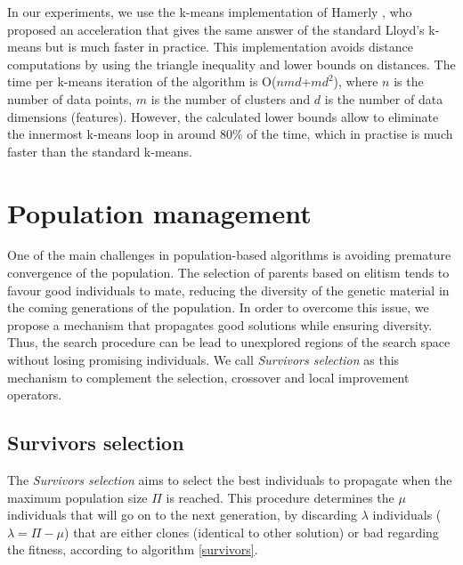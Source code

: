 In our experiments, we use the k-means implementation of Hamerly \cite{Hamerly2010}, who proposed an acceleration that gives the same answer of the standard Lloyd's k-means \cite{Lloyd1982} but is much faster in practice. This implementation avoids distance computations by using the triangle inequality and lower bounds on distances. The time per k-means iteration of the algorithm is O($nmd$+$md^2$), where $n$ is the number of data points, $m$ is the number of clusters and $d$ is the number of data dimensions (features). However, the calculated lower bounds allow to eliminate the innermost k-means loop in around 80\% of the time, which in practise is much faster than the standard k-means.

\section{Population management}
\label{sec:population-management}
One of the main challenges in population-based algorithms is avoiding premature convergence of the population. The selection of parents based on elitism tends to favour good individuals to mate, reducing the diversity of the genetic material in the coming generations of the population. In order to overcome this issue, we propose a mechanism that propagates good solutions while ensuring diversity. Thus, the search procedure can be lead to unexplored regions of the search space without losing promising individuals. We call \textit{Survivors selection} as this mechanism to complement the selection, crossover and local improvement operators.


\subsection{Survivors selection}
\label{subsec:survivors}
The \textit{Survivors selection} aims to select the best individuals to propagate when the maximum population size $\Pi$ is reached. This procedure determines the $\mu$ individuals that will go on to the next generation, by discarding $\lambda$ individuals ($\lambda = \Pi - \mu$) that are either clones (identical to other solution) or bad regarding the fitness, according to algorithm \ref{survivors}.

